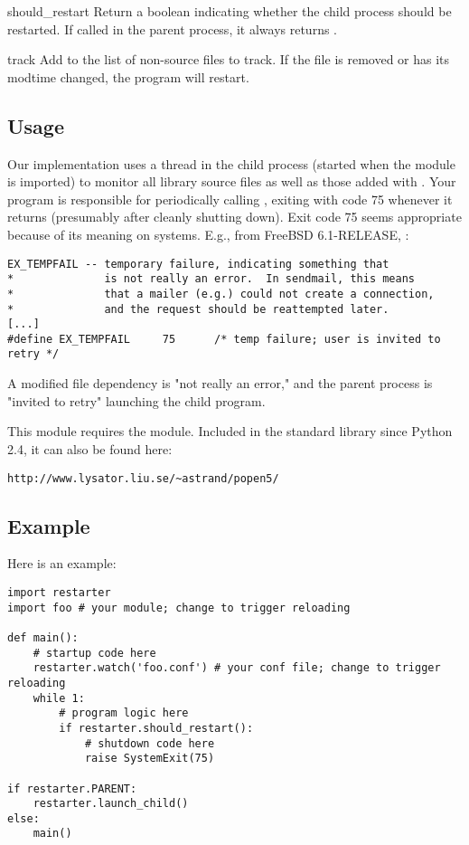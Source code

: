 \begin{funcdesc}{should_restart}{} Return a boolean indicating whether the child
process should be restarted. If called in the parent process, it always returns
. \end{funcdesc}

\begin{funcdesc}{track}{} Add  to the list of
non-source files to track. If the file is removed or has its modtime changed,
the program will restart. \end{funcdesc}


\subsection{Usage}

Our implementation uses a thread in the child process (started when the module
is imported) to monitor all library source files as well as those added with
. Your program is responsible for periodically calling
, exiting with code 75 whenever it returns 
(presumably after cleanly shutting down). Exit code 75 seems appropriate because
of its meaning on \UNIX{} systems. E.g., from FreeBSD 6.1-RELEASE,
:

\begin{verbatim}
EX_TEMPFAIL -- temporary failure, indicating something that
*              is not really an error.  In sendmail, this means
*              that a mailer (e.g.) could not create a connection,
*              and the request should be reattempted later.
[...]
#define EX_TEMPFAIL     75      /* temp failure; user is invited to retry */
\end{verbatim}

A modified file dependency is "not really an error," and the parent process is
"invited to retry" launching the child program.

This module requires the  module. Included in the standard
library since Python 2.4, it can also be found here:

\begin{verbatim}
http://www.lysator.liu.se/~astrand/popen5/
\end{verbatim}


\subsection{Example}

Here is an example:

\begin{verbatim}
import restarter
import foo # your module; change to trigger reloading

def main():
    # startup code here
    restarter.watch('foo.conf') # your conf file; change to trigger reloading
    while 1:
        # program logic here
        if restarter.should_restart():
            # shutdown code here
            raise SystemExit(75)

if restarter.PARENT:
    restarter.launch_child()
else:
    main()
\end{verbatim}